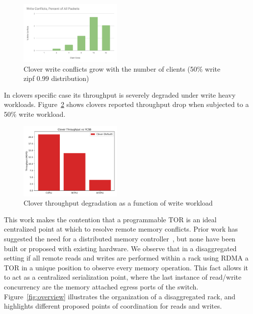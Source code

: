 \begin{figure}
    \includegraphics[width=0.45\textwidth]{fig/write_conflicts.pdf}
    \caption{Clover write conflicts grow with the number of clients
    (50\% write zipf 0.99 distribution)}
    \label{fig:conflicts}
\end{figure}


In clovers specific case its throughput is severely degraded under
write heavy workloads. Figure~\ref{fig:clover_tput} shows clovers
reported throughput drop when subjected to a 50\% write workload.

\begin{figure}
    \includegraphics[width=0.45\textwidth]{fig/clover_tput.pdf}
    \caption{Clover throughput degradation as a function of write
    workload}
    \label{fig:clover_tput}
\end{figure}

This work makes the contention that a programmable TOR is an ideal
centralized point at which to resolve remote memory conflicts. Prior
work has suggested the need for a distributed memory
controller~\cite{disandapp}, but none have been built or proposed with
existing hardware. We observe that in a disaggregated setting if all
remote reads and writes are performed within a rack using RDMA a TOR
in a unique position to observe every memory operation.  This fact
allows it to act as a centralized serialization point, where the last
instance of read/write concurrency are the memory attached egress
ports of the switch.  Figure~\ref{fig:overview} illustrates the
organization of a disaggregated rack, and highlights different
proposed points of coordination for reads and writes.

